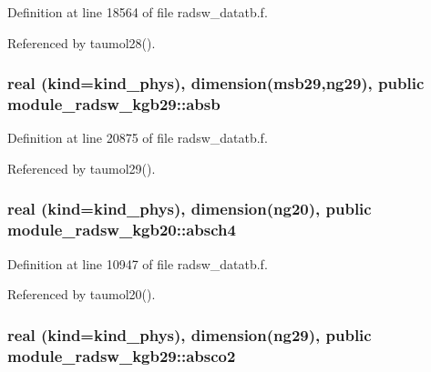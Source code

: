 Definition at line 18564 of file radsw\+\_\+datatb.\+f.



Referenced by taumol28().

\subsubsection[{\texorpdfstring{absb}{absb}}]{\setlength{\rightskip}{0pt plus 5cm}real (kind=kind\+\_\+phys), dimension(msb29,ng29), public module\+\_\+radsw\+\_\+kgb29\+::absb}\hypertarget{group__module__radsw__main_gac9fb794bc4e4a02964b5e5d1431c31c3}{}\label{group__module__radsw__main_gac9fb794bc4e4a02964b5e5d1431c31c3}


Definition at line 20875 of file radsw\+\_\+datatb.\+f.



Referenced by taumol29().

\subsubsection[{\texorpdfstring{absch4}{absch4}}]{\setlength{\rightskip}{0pt plus 5cm}real (kind=kind\+\_\+phys), dimension(ng20), public module\+\_\+radsw\+\_\+kgb20\+::absch4}\hypertarget{group__module__radsw__main_ga1757aee0ec8211f84e2c9334cc9b0f9d}{}\label{group__module__radsw__main_ga1757aee0ec8211f84e2c9334cc9b0f9d}


Definition at line 10947 of file radsw\+\_\+datatb.\+f.



Referenced by taumol20().

\subsubsection[{\texorpdfstring{absco2}{absco2}}]{\setlength{\rightskip}{0pt plus 5cm}real (kind=kind\+\_\+phys), dimension(ng29), public module\+\_\+radsw\+\_\+kgb29\+::absco2}\hypertarget{group__module__radsw__main_gaa9a57e32dfbb8979478aa8c931ff0e2d}{}\label{group__module__radsw__main_gaa9a57e32dfbb8979478aa8c931ff0e2d}


